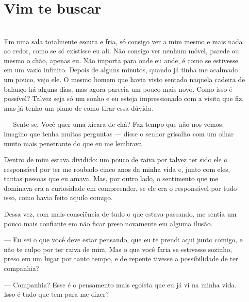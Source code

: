 
\newpage

\ifdefined\useChapters
\chapter{Vim te buscar}
\else
\chapter{}
\fi


Em uma sala totalmente escura e fria, só consigo ver a mim mesmo e mais nada ao redor, como se só existisse eu ali. Não consigo ver nenhum móvel, parede ou mesmo o chão, apenas eu. Não importa para onde eu ande, é como se estivesse em um vazio infinito. Depois de alguns minutos, quando já tinha me acalmado um pouco, vejo ele. O mesmo homem que havia visto sentado naquela cadeira de balanço há alguns dias, mas agora parecia um pouco mais novo. Como isso é possível? Talvez seja só um sonho e eu esteja impressionado com a visita que fiz, mas já tenho um plano de como tirar essa dúvida.

— Sente-se. Você quer uma xícara de chá? Faz tempo que não nos vemos, imagino que tenha muitas perguntas — disse o senhor grisalho com um olhar muito mais penetrante do que eu me lembrava.

Dentro de mim estava dividido: um pouco de raiva por talvez ter sido ele o responsável por ter me roubado cinco anos da minha vida e, junto com eles, tantas pessoas que eu amava. Mas, por outro lado, o sentimento que me dominava era a curiosidade em compreender, se ele era o responsável por tudo isso, como havia feito aquilo comigo.

Dessa vez, com mais consciência de tudo o que estava passando, me sentia um pouco mais confiante em não ficar preso novamente em alguma ilusão.

— Eu sei o que você deve estar pensando, que eu te prendi aqui junto comigo, e não te culpo por ter raiva de mim. Mas o que você faria se estivesse sozinho, preso em um lugar por tanto tempo, e de repente tivesse a possibilidade de ter companhia?

— Companhia? Esse é o pensamento mais egoísta que eu já vi na minha vida. Isso é tudo que tem para me dizer?

